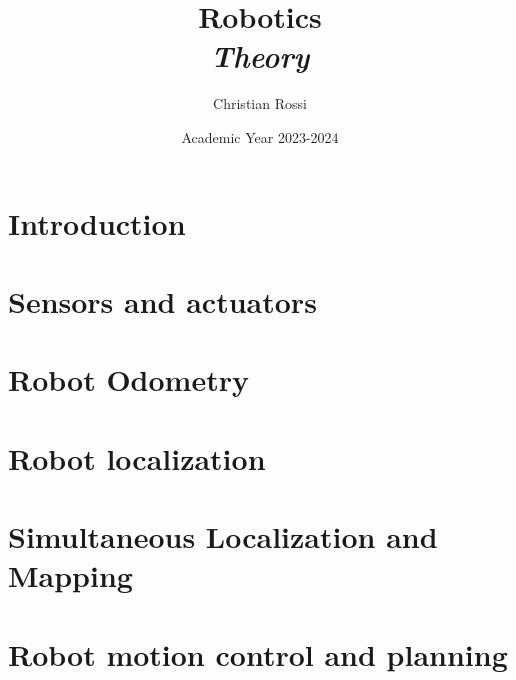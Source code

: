 \documentclass[12pt, a4paper]{report}
\title{Robotics \\ \textit{Theory}}
\author{Christian Rossi}
\date{Academic Year 2023-2024}
\begin{document}
    \maketitle

    

    \cleardoublepage{}

    \tableofcontents

    \cleardoublepage{}

    \chapter{Introduction}
    
    
    

    \chapter{Sensors and actuators}
    
    

    \chapter{Robot Odometry}
    
        
        
        
      
      
      
      
      

    \chapter{Robot localization}
    
    
    
    
    
    
    

    \chapter{Simultaneous Localization and Mapping}
    
    
    
    
    
    

    \chapter{Robot motion control and planning}
    
    
    
    
    
\end{document}
